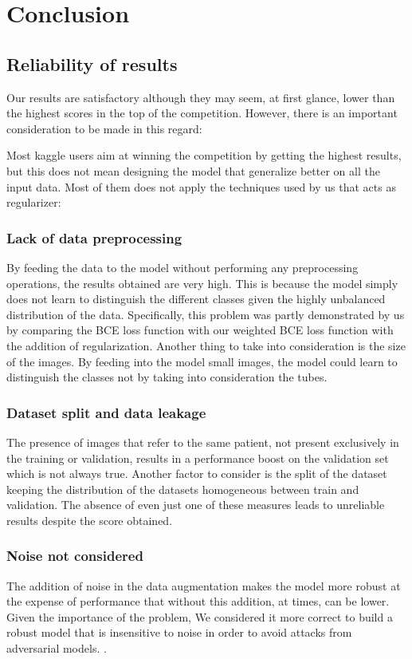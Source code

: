 \documentclass[journal, a4paper]{IEEEtran}
\begin{document}
\section{Conclusion}
\subsection{Reliability of results}
Our results are satisfactory although they may seem, at first glance, lower than the highest scores in the top of the competition. However, there is an important consideration to be made in this regard:

Most kaggle users aim at winning the competition by getting the highest results, but this does not mean designing the model that generalize better on all the input data.
Most of them does not apply the techniques used by us that acts as regularizer:

\subsubsection{Lack of data preprocessing}
By feeding the data to the model without performing any preprocessing operations, the results obtained are very high. This is because the model simply does not learn to distinguish the different classes given the highly unbalanced distribution of the data. Specifically, this problem was partly demonstrated by us by comparing the BCE loss function with our weighted BCE loss function with the addition of regularization. Another thing to take into consideration is the size of the images. By feeding into the model small images, the model could learn to distinguish the classes not by taking into consideration the tubes.


\subsubsection{Dataset split and data leakage}
The presence of images that refer to the same patient, not present exclusively in the training or validation, results in a performance boost on the validation set which is not always true. Another factor to consider is the split of the dataset keeping the distribution of the datasets homogeneous between train and validation. The absence of even just one of these measures leads to unreliable results despite the score obtained.
\subsubsection{Noise not considered}
The addition of noise in the data augmentation makes the model more robust at the expense of performance that without this addition, at times, can be lower. Given the importance of the problem, We considered it more correct to build a robust model that is insensitive to noise in order to avoid attacks from adversarial models.\cite{NOISE} \cite{NOISE2}.
\end{document}

